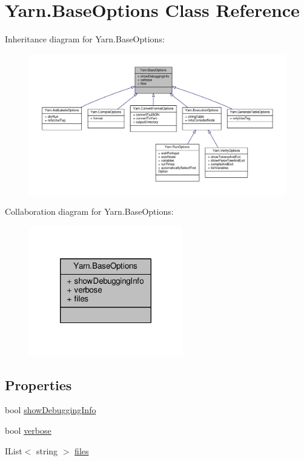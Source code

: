\hypertarget{a00022}{\section{Yarn.\-Base\-Options Class Reference}
\label{a00022}
}


Inheritance diagram for Yarn.\-Base\-Options\-:
\nopagebreak
\begin{figure}[H]
\begin{center}
\leavevmode
\includegraphics[width=350pt]{d6/d08/a00646}
\end{center}
\end{figure}


Collaboration diagram for Yarn.\-Base\-Options\-:
\nopagebreak
\begin{figure}[H]
\begin{center}
\leavevmode
\includegraphics[width=190pt]{d3/d8e/a00647}
\end{center}
\end{figure}
\subsection*{Properties}
\begin{DoxyCompactItemize}
\item 
bool \hyperlink{a00022_a89964ea17bd19caf00cb5bff563ed01c}{show\-Debugging\-Info}
\item 
bool \hyperlink{a00022_ada4d83d1756918f362d55f6649b82b17}{verbose}
\item 
I\-List$<$ string $>$ \hyperlink{a00022_aa93cbb1bc1d5328e0a417012621e92d2}{files}
\end{DoxyCompactItemize}


